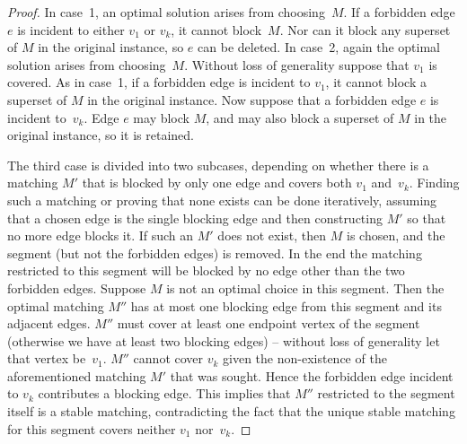 \documentclass[preprint,12pt]{elsarticle}
\begin{document}
\begin{proof}
	In case~1, an optimal solution arises from choosing~$M$. If a forbidden edge $e$ is incident to either $v_1$ or $v_k$, it cannot block~$M$.  Nor can it block any superset of $M$ in the original instance, so $e$ can be deleted. In case~2, again the optimal solution arises from choosing~$M$.  Without loss of generality suppose that $v_1$ is covered.  As in case~1, if a forbidden edge is incident to $v_1$, it cannot block a superset of $M$ in the original instance.  Now suppose that a forbidden edge $e$ is incident to~$v_k$.  Edge $e$ may block $M$, and may also block a superset of $M$ in the original instance, so it is retained. 
	
The third case is divided into two subcases, depending on whether there is a matching $M'$ that is blocked by only one edge and covers both $v_1$ and~$v_k$. Finding such a matching or proving that none exists can be done iteratively, assuming that a chosen edge is the single blocking edge and then constructing $M'$ so that no more edge blocks it. If such an $M'$ does not exist, then $M$ is chosen, and the segment (but not the forbidden edges) is removed. In the end the matching restricted to this segment will be blocked by no edge other than the two forbidden edges. Suppose $M$ is not an optimal choice in this segment. Then the optimal matching $M''$ has at most one blocking edge from this segment and its adjacent edges. $M''$ must cover at least one endpoint vertex of the segment (otherwise we have at least two blocking edges) -- without loss of generality let that vertex be~$v_1$. $M''$ cannot cover $v_k$ given the non-existence of the aforementioned matching $M'$ that was sought.  Hence the forbidden edge incident to $v_k$ contributes a blocking edge. This implies that $M''$ restricted to the segment itself is a stable matching, contradicting the fact that the unique stable matching for this segment covers neither $v_1$ nor~$v_k$.



\end{proof}
\end{document}
